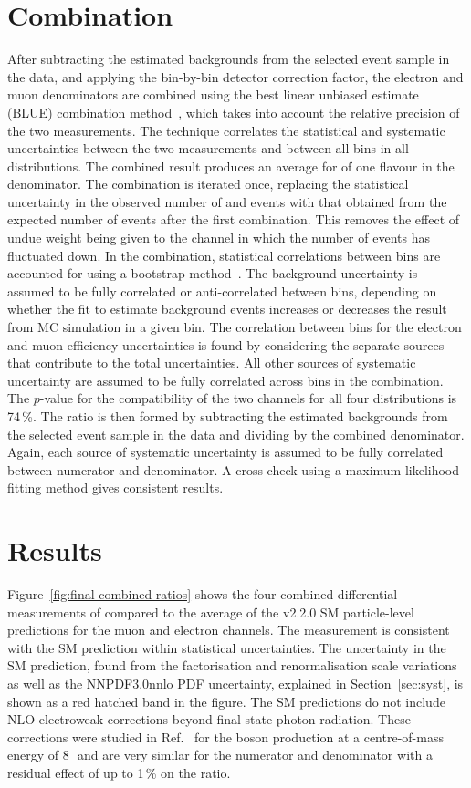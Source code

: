 \documentclass[cernpreprint,txfonts,UKenglish,texlive=2016]{\ATLASLATEXPATH atlasdoc}
\begin{document}
\section{Combination}
\label{sec:combo}
After subtracting the estimated backgrounds from the selected \lljet{}
event sample in the data, and applying the bin-by-bin detector correction factor, the electron
and muon denominators are combined
using the best linear unbiased estimate (BLUE) combination method~\cite{Nisius:2014wua}, which takes
into account the relative precision of the two measurements.
The technique correlates 
the statistical and systematic uncertainties between the two measurements 
and between all bins in all distributions. 
The combined result produces an average for  \lljet{} of one flavour
in the denominator. 
The combination is iterated once,
replacing the statistical uncertainty in the observed number of \Zmumu{} and
\Zee{} events with that obtained from the expected number of  events after the first combination. 
This removes the effect of undue weight being given to the channel in which the number
of events has fluctuated down.
In the combination, statistical correlations
between bins are accounted for using a bootstrap
method~\cite{PhysRevD.39.274}.
The  \Zll{} background uncertainty is assumed to be fully correlated
or anti-correlated between bins, depending on whether the fit to
estimate \Zll{} background events increases or decreases the result
from MC simulation in a given bin. The correlation between bins for the electron
and muon efficiency uncertainties is found by considering the separate
sources that contribute to the total uncertainties.
All other sources of systematic uncertainty are assumed to be fully correlated across bins in the combination. 
The $p$-value for the compatibility of the two channels for all four
distributions is 74\,\%.
The ratio is then formed by subtracting the estimated backgrounds from the selected
\ptmissjet{} event sample in the data and dividing by the combined denominator.
Again, each source of systematic uncertainty is assumed
to be fully correlated between numerator and denominator.
A cross-check using a maximum-likelihood fitting method gives
consistent results.

\section{Results}
\label{sec:results}
Figure~\ref{fig:final-combined-ratios} shows the four combined differential
measurements of \Rmiss{} compared to the average of the \sherpa{} v2.2.0 SM particle-level predictions 
for the muon and electron channels. The measurement is consistent with the SM prediction within
statistical uncertainties. 
The uncertainty in the SM prediction,
found from the factorisation and renormalisation scale variations as
well as the NNPDF3.0nnlo PDF uncertainty, explained in Section~\ref{sec:syst}, is
shown as a red hatched band in the figure.
The SM predictions do not include NLO electroweak corrections beyond
final-state photon radiation. These corrections were studied in
Ref.~\cite{Denner:2012ts} for the \Z{} boson production at a 
centre-of-mass energy of 8\,\TeV\ and are very similar for the numerator
and denominator with a residual effect of up to 1\,\% on the ratio. 
\end{document}
